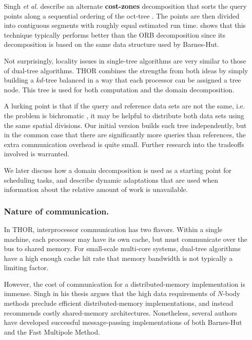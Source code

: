 \documentclass[twoside,leqno,twocolumn]{article}
\newcommand{\mysubsub}[1]{\subsubsection{#1.}}
\newcommand{\defterm}[1]{{\bf #1}}
\begin{document}
Singh {\it et al.} describe an alternate \defterm{cost-zones} decomposition that sorts the query points along a sequential ordering of the oct-tree \cite{singh95load}.
The points are then divided into contiguous segments with roughly equal estimated run time.
\cite{singh95load} shows that this technique typically performs better than the ORB decomposition since its decomposition is based on the same data structure used by Barnes-Hut.

Not surprisingly, locality issues in single-tree algorithms are very similar to those of dual-tree algorithms.
THOR combines the strengths from both ideas by simply building a $kd$-tree balanced in a way that each processor can be assigned a tree node.
This tree is used for both computation and the domain decomposition.

A lurking point is that if the query and reference data sets are not the same, i.e. the problem is bichromatic , it may be helpful to distribute both data sets using the same spatial divisions.
Our initial version builds each tree independently, but in the common case that there are significantly more queries than references, the extra communication overhead is quite small.
Further research into the tradeoffs involved is warranted.

We later discuss how a domain decomposition is used as a starting point for scheduling tasks, and describe dynamic adaptations that are used when information about the relative amount of work is unavailable.

\mysubsub{Nature of communication}

In THOR, interprocessor communication has two flavors.
Within a single machine, each processor may have its own cache, but must communicate over the bus to shared memory.
For small-scale multi-core systems, dual-tree algorithms have a high enough cache hit rate that memory bandwidth is not typically a limiting factor.

However, the cost of communication for a distributed-memory implementation is immense.
Singh in his thesis \cite{singh_thesis} argues that the high data requirements of $N$-body methods preclude efficient distributed-memory implementations, and instead recommends costly shared-memory architectures.
Nonetheless, several authors \cite{salmon_thesis, liu94experiences, salmon97parallel} have developed successful message-passing implementations of both Barnes-Hut and the Fast Multipole Method.
\end{document}
